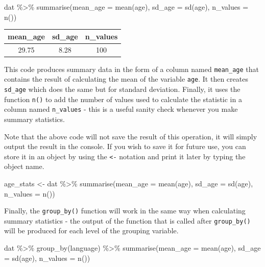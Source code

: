 \documentclass[
  english,
  doc,floatsintext]{apa6}
\newenvironment{Shaded}{\begin{snugshade}}{\end{snugshade}}
\newcommand{\AttributeTok}[1]{\textcolor[rgb]{0.77,0.63,0.00}{#1}}
\newcommand{\FunctionTok}[1]{\textcolor[rgb]{0.00,0.00,0.00}{#1}}
\newcommand{\NormalTok}[1]{#1}
\newcommand{\OtherTok}[1]{\textcolor[rgb]{0.56,0.35,0.01}{#1}}
\newcommand{\SpecialCharTok}[1]{\textcolor[rgb]{0.00,0.00,0.00}{#1}}
\begin{document}
\begin{Shaded}
\begin{Highlighting}[]
\NormalTok{dat }\SpecialCharTok{\%\textgreater{}\%}
  \FunctionTok{summarise}\NormalTok{(}\AttributeTok{mean\_age =} \FunctionTok{mean}\NormalTok{(age),}
            \AttributeTok{sd\_age =} \FunctionTok{sd}\NormalTok{(age),}
            \AttributeTok{n\_values =} \FunctionTok{n}\NormalTok{())}
\end{Highlighting}
\end{Shaded}

\begin{tabular}{c|c|c}
\hline
mean\_age & sd\_age & n\_values\\
\hline
29.75 & 8.28 & 100\\
\hline
\end{tabular}

This code produces summary data in the form of a column named \texttt{mean\_age} that contains the result of calculating the mean of the variable \texttt{age}. It then creates \texttt{sd\_age} which does the same but for standard deviation. Finally, it uses the function \texttt{n()} to add the number of values used to calculate the statistic in a column named \texttt{n\_values} - this is a useful sanity check whenever you make summary statistics.

Note that the above code will not save the result of this operation, it will simply output the result in the console. If you wish to save it for future use, you can store it in an object by using the \texttt{\textless{}-} notation and print it later by typing the object name.

\begin{Shaded}
\begin{Highlighting}[]
\NormalTok{age\_stats }\OtherTok{\textless{}{-}}\NormalTok{ dat }\SpecialCharTok{\%\textgreater{}\%}
  \FunctionTok{summarise}\NormalTok{(}\AttributeTok{mean\_age =} \FunctionTok{mean}\NormalTok{(age),}
            \AttributeTok{sd\_age =} \FunctionTok{sd}\NormalTok{(age),}
            \AttributeTok{n\_values =} \FunctionTok{n}\NormalTok{())}
\end{Highlighting}
\end{Shaded}

Finally, the \texttt{group\_by()} function will work in the same way when calculating summary statistics - the output of the function that is called after \texttt{group\_by()} will be produced for each level of the grouping variable.

\begin{Shaded}
\begin{Highlighting}[]
\NormalTok{dat }\SpecialCharTok{\%\textgreater{}\%}
  \FunctionTok{group\_by}\NormalTok{(language) }\SpecialCharTok{\%\textgreater{}\%}
  \FunctionTok{summarise}\NormalTok{(}\AttributeTok{mean\_age =} \FunctionTok{mean}\NormalTok{(age),}
            \AttributeTok{sd\_age =} \FunctionTok{sd}\NormalTok{(age),}
            \AttributeTok{n\_values =} \FunctionTok{n}\NormalTok{())}
\end{Highlighting}
\end{Shaded}
\end{document}
